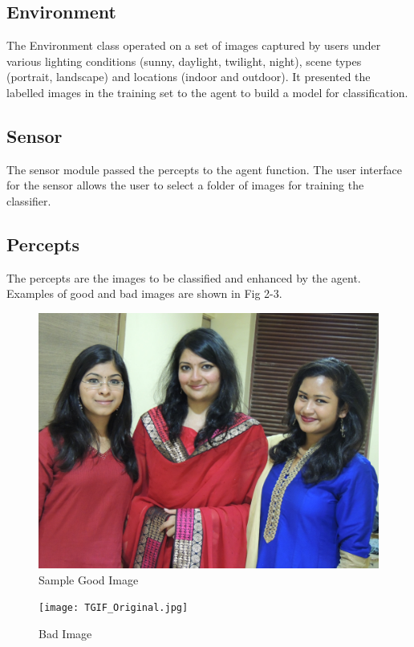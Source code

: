 \subsection{Environment}
\label{sec:2}
The Environment class operated on a set of images captured by users under various lighting conditions (sunny, daylight, twilight, night), scene types (portrait, landscape) and locations (indoor and outdoor). 
It presented the labelled images in the training set to the agent to build a model for classification.
\subsection{Sensor} 
The sensor module passed the percepts to the agent function. The user interface for the sensor allows the user to select a folder of images for training the classifier.
\subsection{Percepts}
The percepts are the images to be classified and enhanced by the agent. Examples of good and bad images are shown in Fig 2-3.
\begin{figure}[!h]
  \includegraphics[scale=0.20]{Farewell_Original.jpg}
\caption{Sample Good Image}
\label{fig:2} 
\end{figure}

\begin{figure}[!h]
  \texttt{[image: TGIF\_Original.jpg]}
\caption{Bad Image}
\label{fig:3}       
\end{figure}

